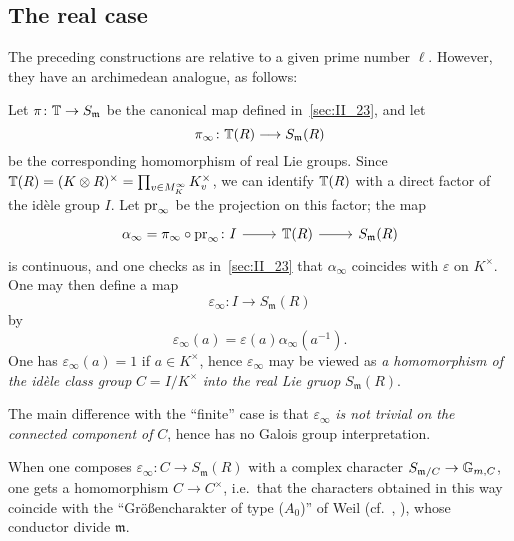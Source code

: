 \subsection{The real case}
The preceding constructions are relative to a given prime number $\ell$.
However, they have an archimedean analogue, as follows: 

Let $\pi \colon \mathbb{T} \to S_\mathfrak{m}$ be the canonical map defined 
in~\ref{sec:II_23}, and let 
\[
	\pi_{\infty} \colon \mathbb{T}(R) \longrightarrow S_\mathfrak{m}(R)
\]
be the corresponding homomorphism of real Lie groups. Since $\mathbb{T}(R) = (K
\otimes R)^{\times} = \prod_{v \in M_K^\infty} K_v^{\times}$, we can identify
$\mathbb{T}(R)$ with a direct factor of the idèle group $I$. Let $\operatorname{pr}_\infty$ be the
projection on this factor; the map 
\dpage
\[\begin{tikzcd}
	\alpha_\infty = \pi_\infty \circ \pr_\infty \colon I \arrow[r] & \TT(R) 
	\arrow[r] & S_\mathfrak{m}(R)
\end{tikzcd}\]
is continuous, and one checks as in~\ref{sec:II_23} that $\alpha_\infty$ 
coincides with $\varepsilon$ on $K^{\times}$. One may then define a map
\[
	\varepsilon_{\infty} \colon I \longrightarrow S_{\mathfrak{m}}(R)
\]
by 
\[
	\varepsilon_\infty(a) = \varepsilon(a)\alpha_\infty(a^{-1}).
\]
One has $\varepsilon_\infty(a) = 1$ if $a \in K^{\times}$, hence 
$\varepsilon_\infty$ may be viewed as \emph{a homomorphism of the idèle 
class group} $C = I/K^{\times}$ \emph{into the real Lie gruop} $S_\mathfrak{m}
(R)$.

The main difference with the ``finite'' case is that $\varepsilon_\infty$ 
\emph{is not trivial on the connected component of} $C$, hence has no Galois 
group interpretation.

When one composes $\varepsilon_\infty \colon C \to S_\mathfrak{m}(R)$ with a 
complex character $S_{\mathfrak{m}/C} \to \mathbb{G}_{m, C}$, one gets a 
homomorphism $C \to C^{\times}$, i.e.\ that the characters obtained in this way 
coincide with the ``Gr\"o\ss encharakter of type ($A_0$)'' of Weil (cf.\ 
\cite{35}, \cite{41}), whose conductor divide $\mathfrak{m}$.

